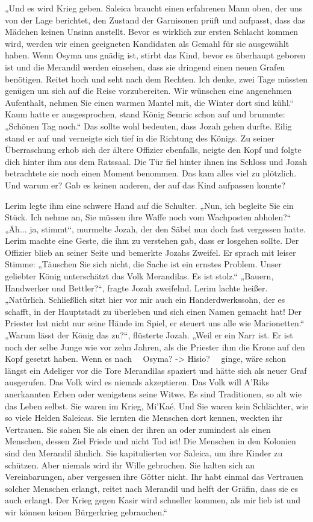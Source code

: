„Und es wird Krieg geben. Saleica braucht einen erfahrenen Mann oben, der uns von der Lage 
berichtet, den Zustand der Garnisonen prüft und aufpasst, dass das Mädchen keinen Unsinn anstellt. 
Bevor es wirklich zur ersten Schlacht kommen wird, werden wir einen geeigneten Kandidaten als Gemahl 
für sie ausgewählt haben. Wenn Osyma uns gnädig ist, stirbt das Kind, bevor es überhaupt geboren ist 
und die Merandil werden einsehen, dass sie dringend einen neuen Grafen benötigen. Reitet hoch und 
seht nach dem Rechten. Ich denke, zwei Tage müssten genügen um sich auf die Reise vorzubereiten. Wir 
wünschen eine angenehmen Aufenthalt, nehmen Sie einen warmen Mantel mit, die Winter dort sind kühl.“
Kaum hatte er ausgesprochen, stand König Semric schon auf und brummte: „Schönen Tag noch.“
Das sollte wohl bedeuten, dass Jozah gehen durfte. Eilig stand er auf und verneigte sich tief in die 
Richtung des Königs. Zu seiner Überraschung erhob sich der ältere Offizier ebenfalls, neigte den 
Kopf und folgte dich hinter ihm aus dem Ratssaal. 
Die Tür fiel hinter ihnen ins Schloss und Jozah betrachtete sie noch einen Moment benommen. Das kam 
alles viel zu plötzlich. Und warum er? Gab es keinen anderen, der auf das Kind aufpassen konnte?

Lerim legte ihm eine schwere Hand auf die Schulter. „Nun, ich begleite Sie ein Stück. Ich nehme an, 
Sie müssen ihre Waffe noch vom Wachposten abholen?“
„Äh... ja, stimmt“, murmelte Jozah, der den Säbel nun doch fast vergessen hatte.
Lerim machte eine Geste, die ihm zu verstehen gab, dass er losgehen sollte. Der Offizier blieb an 
seiner Seite und bemerkte Jozahs Zweifel. Er sprach mit leiser Stimme: „Täuschen Sie sich nicht, die 
Sache ist ein ernstes Problem. Unser geliebter König unterschätzt das Volk Merandilas. Es ist 
stolz.“
„Bauern, Handwerker und Bettler?“, fragte Jozah zweifelnd.
Lerim lachte heißer. „Natürlich. Schließlich sitzt hier vor mir auch ein Handerdwerkssohn, der es 
schafft, in der Hauptstadt zu überleben und sich einen Namen gemacht hat! Der Priester hat nicht nur 
seine Hände im Spiel, er steuert uns alle wie Marionetten.“
„Warum lässt der König das zu?“, flüsterte Jozah.
„Weil er ein Narr ist. Er ist noch der selbe Junge wie vor zehn Jahren, als die Priester ihm die 
Krone auf den Kopf gesetzt haben. Wenn es nach ~~Osyma? -> Hisio?~~ ginge, wäre schon längst ein 
Adeliger vor die Tore Merandilas spaziert und hätte sich als neuer Graf ausgerufen. Das Volk wird es 
niemals akzeptieren. Das Volk will A'Riks anerkannten Erben oder wenigstens seine Witwe. Es sind 
Traditionen, so alt wie das Leben selbst. Sie waren im Krieg, Mi'Kaé. Und Sie waren kein Schlächter, 
wie so viele Helden Saleicas. Sie lernten die Menschen dort kennen, weckten ihr Vertrauen. Sie sahen 
Sie als einen der ihren an oder zumindest als einen Menschen, dessen Ziel Friede und nicht Tod ist! 
Die Menschen in den Kolonien sind den Merandil ähnlich. Sie kapitulierten vor Saleica, um ihre 
Kinder zu schützen. Aber niemals wird ihr Wille gebrochen. Sie halten sich an Vereinbarungen, aber 
vergessen ihre Götter nicht. Ihr habt einmal das Vertrauen solcher Menschen erlangt, reitet nach 
Merandil und helft der Gräfin, dass sie es auch erlangt. Der Krieg gegen Kasir wird schneller 
kommen, als mir lieb ist und wir können keinen Bürgerkrieg gebrauchen.“

